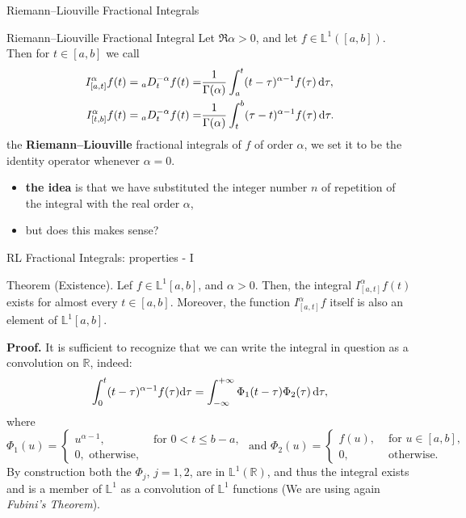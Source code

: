 \documentclass[aspectratio=169,xcolor=dvipsnames]{beamer}
\begin{document}
\begin{frame}{Riemann--Liouville Fractional Integrals}

\begin{block}{Riemann--Liouville Fractional Integral}
Let $\Re\alpha > 0$, and let $f \in \mathbb{L}^1([a,b])$. Then for $t \in [a,b]$ we call
\begin{eqnarray*}
I_{[a,t]}^\alpha f(t) = {}_{a}{D_t^{-\alpha}}f(t) = & \displaystyle \frac{1}{\Gamma({\alpha})} \int_{a}^{t} (t-\tau)^{{\alpha} - 1} f(\tau) \,{\rm d}\tau,\\
I_{[t,b]}^\alpha f(t) = {}_{a}{D_t^{-\alpha}}f(t) = & \displaystyle \frac{1}{\Gamma({\alpha})} \int_{t}^{b} (\tau-t)^{{\alpha} - 1} f(\tau) \,{\rm d}\tau.
\end{eqnarray*}
the \textbf{Riemann--Liouville} fractional integrals of $f$ of order $\alpha$, we set it to be the identity operator whenever $\alpha = 0$.
\end{block}

\begin{itemize}
	\item[{\faLightbulb}] \textbf{the idea} is that we have substituted the integer number  $n$ of repetition of the integral with the real order $\alpha$,
	\item[{\faQuestionCircle}] but does \alert{this makes sense}?
\end{itemize}
 

\end{frame}

\begin{frame}{RL Fractional Integrals: properties - I}

\begin{alertblock}{Theorem (Existence).}
Lef $f \in \mathbb{L}^{1}[a,b]$, and $\alpha > 0$. Then, the integral $I_{[a,t]}^{\alpha}f(t)$ exists for almost every $t \in [a,b]$. Moreover, the function $I_{[a,t]}^{\alpha}f$ itself is also an element of $\mathbb{L}^{1}[a,b]$.
\end{alertblock}

\textbf{Proof.} It is sufficient to recognize that we can write the integral in question as
a convolution on $\mathbb{R}$, indeed:
\[
\int_{0}^{t} (t-\tau)^{{\alpha} - 1} f(\tau) {\rm d}\tau = \int_{-\infty}^{+\infty} \Phi_1(t-\tau) \Phi_2(\tau)\,{\rm d}\tau,
\]
where
\[
\Phi_1(u) = \begin{cases}
	u^{\alpha - 1}, & \text{ for } 0 < t \leq b-a,\\
	0, \text{ otherwise},
\end{cases} \text{ and } \Phi_2(u) = \begin{cases}
	f(u), & \text{ for } u \in [a,b],\\
	0, & \text{ otherwise}.
\end{cases}
\]
By construction both the $\Phi_j$, $j=1,2$, are in $\mathbb{L}^1(\mathbb{R})$, and thus the integral exists and is a member of $\mathbb{L}^1$ as a convolution of $\mathbb{L}^1$ functions (We are using again \emph{Fubini's Theorem}).
\end{frame}
\end{document}

